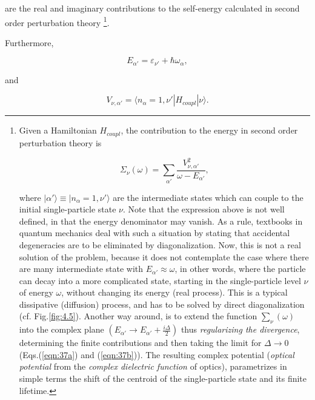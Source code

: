 \documentclass[a4paper,14pt]{book}
\begin{document}
\noindent are the real and imaginary contributions to the self-energy calculated in second order perturbation theory \footnote{Given a Hamiltonian $H_{coupl}$, the contribution to the energy in second order perturbation theory is

{\protect
\begin{equation}
\Sigma_{\nu}(\omega) = \sum_{\alpha'} \frac{V_{\nu ,\alpha'}^2}{\omega - E_{\alpha'}} ,
\label{eqn:37c}
\end{equation}
}

\noindent where $|\alpha' \rangle \equiv |n_{\alpha}=1,\nu' \rangle$ are the intermediate states which can couple to the initial single-particle state $\nu$. Note that the expression above is not well defined, in that the energy denominator may vanish. As a rule, textbooks in quantum mechanics deal with such a situation by stating that accidental degeneracies are to be eliminated by diagonalization. Now, this is not a real solution of the problem, because it does not contemplate the case where there are many intermediate state with $E_{\alpha'} \approx \omega$, in other words, where the particle can decay into a more complicated state, starting in the single-particle level $\nu$ of energy $\omega$, without changing its energy (real process). This is a typical dissipative (diffusion) process, and has to be solved by direct diagonalization (cf. Fig.\ref{fig:4.5}). Another way around, is to extend the function $\sum_{\nu}(\omega)$ into the complex plane $(E_{\alpha'} \rightarrow E_{\alpha'} + \frac{i\Delta}{2})$ thus {\it regularizing the divergence}, determining the finite contributions and then taking the limit for $\Delta \rightarrow 0$ (Eqs.(\ref{eqn:37a}) and (\ref{eqn:37b})). The resulting complex potential ({\it optical potential} from the {\it complex dielectric function} of optics), parametrizes in simple terms the shift of the centroid of the single-particle state and its finite lifetime.}.

Furthermore,

\begin{equation}
\nonumber
E_{\alpha'} = \varepsilon_{\nu'} + \hbar \omega_{\alpha},
\end{equation}

\noindent and

\begin{equation}
\nonumber
V_{\nu ,\alpha'} = \langle n_{\alpha}=1,\nu'|H_{coupl}|\nu \rangle .
\end{equation}
\end{document}
